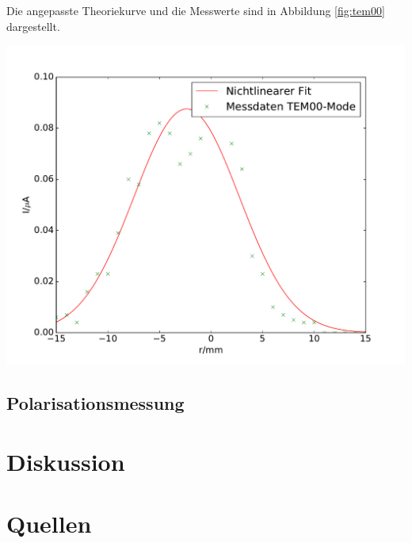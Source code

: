 \documentclass[]{scrartcl}
\begin{document}
Die angepasste Theoriekurve und die Messwerte sind in Abbildung \ref{fig:tem00} dargestellt.
\begin{center}
	\includegraphics[width=\textwidth]{images/tem00.pdf}
	\label{fig:tem00}
\end{center}
\subsection{Polarisationsmessung}

\section{Diskussion}

\section{Quellen}
\end{document}
